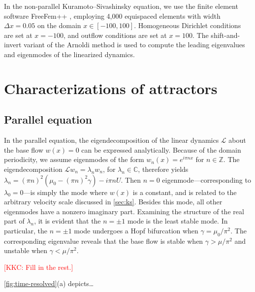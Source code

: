 \documentclass[11pt]{article}
\newcommand*{\Complex}{\mathbb{C}}
\newcommand*{\Ints}{\mathbb{Z}}
\renewcommand*{\L}{\mathscr{L}}
\newcommand{\KSE}{Kuramoto--Sivashinsky equation}
\newcommand{\kkc}[1]{\textcolor{red}{[KKC: #1]}}
\begin{document}
In the non-parallel \KSE, we use the finite element software FreeFem++ \citep{HechtJNM12}, employing 4,000 equispaced elements with width $\Delta x = 0.05$ on the domain $x \in [-100, 100]$.
Homogeneous Dirichlet conditions are set at $x = -100$, and outflow conditions are set at $x = 100$.
The shift-and-invert variant of the Arnoldi method \citep[see][]{TrefethenNLA} is used to compute the leading eigenvalues and eigenmodes of the linearized dynamics.

\section{Characterizations of attractors}
\label{sec:attractors}

\subsection{Parallel equation}

In the parallel equation, the eigendecomposition of the linear dynamics $\L$ about the base flow $w(x) = 0$ can be expressed analytically.
Because of the domain periodicity, we assume eigenmodes of the form $w_n(x) = e^{i \pi n x}$ for $n \in \Ints$.
The eigendecomposition $\L w_n = \lambda_n w_n$, for $\lambda_n \in \Complex$, therefore yields $\lambda_n = (\pi n)^2 (\mu_0 - (\pi n)^2 \gamma) - i \pi n U$.
Then $n = 0$ eigenmode---corresponding to $\lambda_0 = 0$---is simply the mode where $w(x)$ is a constant, and is related to the arbitrary velocity scale discussed in \autoref{sec:ks}.
Besides this mode, all other eigenmodes have a nonzero imaginary part.
Examining the structure of the real part of $\lambda_n$, it is evident that the $n = \pm 1$ mode is the least stable mode.
In particular, the $n = \pm 1$ mode undergoes a Hopf bifurcation when $\gamma = \mu_0 / \pi^2$.
The corresponding eigenvalue reveals that the base flow is stable when $\gamma > \mu / \pi^2$ and unstable when $\gamma < \mu / \pi^2$.

\kkc{Fill in the rest.}

\autoref{fig:time-resolved}(a) depicts\ldots
\end{document}

